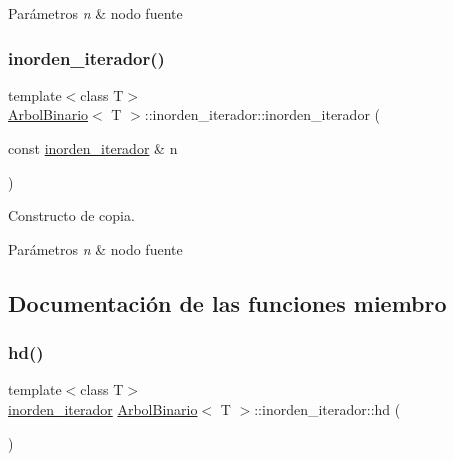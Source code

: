 \begin{DoxyParams}{Parámetros}
{\em n} & nodo fuente \\
\hline
\end{DoxyParams}
\mbox{\label{classArbolBinario_1_1inorden__iterador_ac253108ace744471eb4e64278a44071a}} 
\subsubsection{\texorpdfstring{inorden\+\_\+iterador()}{inorden\_iterador()}\hspace{0.1cm}{\footnotesize\ttfamily [3/3]}}
{\footnotesize\ttfamily template$<$class T$>$ \\
\hyperlink{classArbolBinario}{Arbol\+Binario}$<$ T $>$\+::inorden\+\_\+iterador\+::inorden\+\_\+iterador (\begin{DoxyParamCaption}\item[{const \hyperlink{classArbolBinario_1_1inorden__iterador}{inorden\+\_\+iterador} \&}]{n }\end{DoxyParamCaption})\hspace{0.3cm}{\ttfamily [inline]}}



Constructo de copia. 


\begin{DoxyParams}{Parámetros}
{\em n} & nodo fuente \\
\hline
\end{DoxyParams}


\subsection{Documentación de las funciones miembro}
\mbox{\label{classArbolBinario_1_1inorden__iterador_a05e0bd4966015fb259e53c230ff2eab0}} 
\subsubsection{\texorpdfstring{hd()}{hd()}}
{\footnotesize\ttfamily template$<$class T$>$ \\
\hyperlink{classArbolBinario_1_1inorden__iterador}{inorden\+\_\+iterador} \hyperlink{classArbolBinario}{Arbol\+Binario}$<$ T $>$\+::inorden\+\_\+iterador\+::hd (\begin{DoxyParamCaption}{ }\end{DoxyParamCaption})\hspace{0.3cm}{\ttfamily [inline]}}



